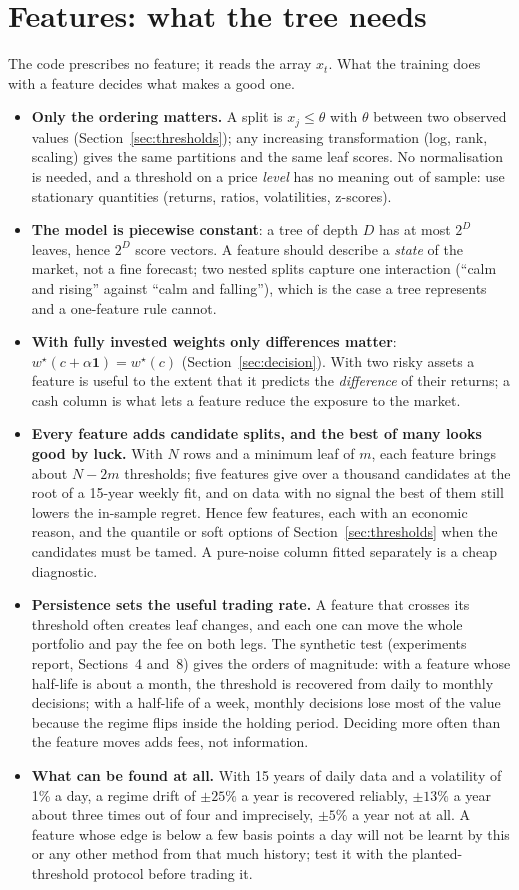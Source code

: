 \documentclass[11pt,a4paper]{article}
\newcommand{\1}{\mathbf{1}}
\begin{document}
\section{Features: what the tree needs}\label{sec:features}
The code prescribes no feature; it reads the array $x_t$. What the training does with a feature decides what makes a good one.
\begin{itemize}\setlength{\itemsep}{1pt}
\item \textbf{Only the ordering matters.} A split is $x_j\le\theta$ with $\theta$ between two observed values (Section~\ref{sec:thresholds}); any increasing transformation (log, rank, scaling) gives the same partitions and the same leaf scores. No normalisation is needed, and a threshold on a price \emph{level} has no meaning out of sample: use stationary quantities (returns, ratios, volatilities, z-scores).
\item \textbf{The model is piecewise constant}: a tree of depth $D$ has at most $2^D$ leaves, hence $2^D$ score vectors. A feature should describe a \emph{state} of the market, not a fine forecast; two nested splits capture one interaction (``calm and rising'' against ``calm and falling''), which is the case a tree represents and a one-feature rule cannot.
\item \textbf{With fully invested weights only differences matter}: $w^\star(c+\alpha\1)=w^\star(c)$ (Section~\ref{sec:decision}). With two risky assets a feature is useful to the extent that it predicts the \emph{difference} of their returns; a cash column is what lets a feature reduce the exposure to the market.
\item \textbf{Every feature adds candidate splits, and the best of many looks good by luck.} With $N$ rows and a minimum leaf of $m$, each feature brings about $N-2m$ thresholds; five features give over a thousand candidates at the root of a 15-year weekly fit, and on data with no signal the best of them still lowers the in-sample regret. Hence few features, each with an economic reason, and the quantile or soft options of Section~\ref{sec:thresholds} when the candidates must be tamed. A pure-noise column fitted separately is a cheap diagnostic.
\item \textbf{Persistence sets the useful trading rate.} A feature that crosses its threshold often creates leaf changes, and each one can move the whole portfolio and pay the fee on both legs. The synthetic test (experiments report, Sections~4 and~8) gives the orders of magnitude: with a feature whose half-life is about a month, the threshold is recovered from daily to monthly decisions; with a half-life of a week, monthly decisions lose most of the value because the regime flips inside the holding period. Deciding more often than the feature moves adds fees, not information.
\item \textbf{What can be found at all.} With 15 years of daily data and a volatility of 1\% a day, a regime drift of $\pm25\%$ a year is recovered reliably, $\pm13\%$ a year about three times out of four and imprecisely, $\pm5\%$ a year not at all. A feature whose edge is below a few basis points a day will not be learnt by this or any other method from that much history; test it with the planted-threshold protocol before trading it.
\end{itemize}
\end{document}
